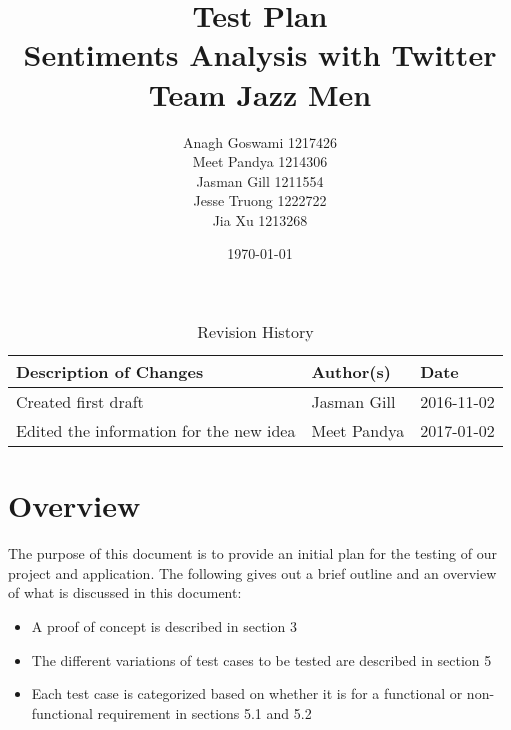 \documentclass{article}
\begin{document}
\title{Test Plan\\  Sentiments Analysis with Twitter \\Team Jazz Men}
\author{Anagh Goswami 1217426 \\ Meet Pandya 1214306 \\ Jasman Gill  1211554 \\ Jesse Truong  1222722 \\ Jia Xu  1213268 \\}
\date{\today}
\maketitle

\maketitle

\newpage

\tableofcontents

\begin{table}[h]
\centering
\caption{Revision History}
\begin{tabular}{p{9cm}ll}
\toprule
\textbf{Description of Changes} & \textbf{Author(s)} & \textbf{Date}\\\midrule
Created first draft & Jasman Gill & 2016-11-02\\\midrule
Edited the information for the new idea & Meet Pandya & 2017-01-02\\\bottomrule
\end{tabular}
\end{table}

\newpage

\section{Overview}

The purpose of this document is to provide an initial plan for the testing of our project and application. The following gives out a brief outline and an overview of what is discussed in this document:
	\begin{itemize}
		\item A proof of concept is described in section 3
		\item The different variations of test cases to be tested are described in section 5
		\item Each test case is categorized based on whether it is for a functional or non-functional requirement in sections 5.1 and 5.2
	\end{itemize}
\end{document}
